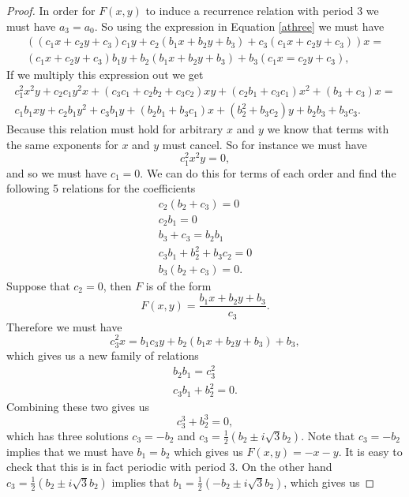\documentclass[12pt]{article}
\begin{document}
\begin{proof}
In order for $F(x,y)$ to induce a recurrence relation with period $3$ we must have $a_3=a_0$. So using the expression in Equation \ref{athree} we must have 
\begin{align*}
\left( (c_1 x + c_2 y +c_3) c_1 y + c_2 (b_1 x + b_2 y + b_3) + c_3(c_1 x + c_2 y +c_3) \right) x = \\(c_1 x + c_2 y + c_3) b_1 y + b_2(b_1 x + b_2 y + b_3) + b_3 (c_1 x = c_2 y + c_3),
\end{align*}
If we multiply this expression out we get 
\begin{align*}
c_1^2 x^2 y + c_2 c_1 y^2 x + (c_3 c_1 + c_2 b_2 + c_3 c_2)xy + (c_2b_1 + c_3 c_1) x^2 + (b_3 + c_3)x = \\ c_1 b_1 xy + c_2 b_1 y^2 + c_3 b_1 y + (b_2 b_1 + b_3 c_1)x + (b_2^2 +b_3 c_2)y + b_2 b_3 + b_3 c_3.
\end{align*}
Because this relation must hold for arbitrary $x$ and $y$ we know that terms with the same exponents for $x$ and $y$ must cancel. So for instance we must have 
\begin{equation*}
c_1^2 x^2 y = 0, 
\end{equation*}
and so we must have $c_1=0$. We can do this for terms of each order and find the following 5 relations for the coefficients 
\begin{align}
\label{fiverelations}
c_2(b_2 + c_3) =0 \\
c_2 b_1 = 0 \\
b_3 + c_3 = b_2 b_1 \\
c_3 b_1 + b_2^2 + b_3 c_2 =0 \\
b_3(b_2 + c_3) = 0. 
\end{align}
Suppose that $c_2 =0$, then $F$ is of the form 
\begin{equation*}
F(x,y) = \frac{ b_1 x + b_2 y + b_3}{c_3}.
\end{equation*}
Therefore we must have 
\begin{equation*}
c_3^2 x = b_1 c_3 y + b_2 (b_1 x + b_2 y + b_3) + b_3,
\end{equation*}
which gives us a new family of relations 
\begin{align*}
b_2 b_1 = c_3^2 \\
c_3 b_1 + b_2^2 =0.
\end{align*}
Combining these two gives us 
\begin{equation*}
c_3^3 + b_2^3 = 0, 
\end{equation*}
which has three solutions $c_3 = -b_2$ and $c_3 = \frac{1}{2} ( b_2 \pm i\sqrt{3}b_2)$. Note that $c_3 = -b_2$ implies that we must have $b_1=b_2$ which gives us $F(x,y) = -x -y$. It is easy to check that this is in fact periodic with period 3. On the other hand $c_3 = \frac{1}{2} ( b_2 \pm i\sqrt{3}b_2)$ implies that $b_1 = \frac{1}{2} ( -b_2 \pm i\sqrt{3}b_2)$, which gives us 

\end{proof}
\end{document}
